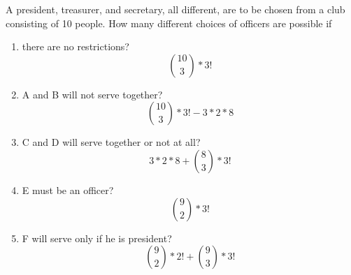 \item A president, treasurer, and secretary, all different, are to be chosen from a club consisting of 10 people. How many different choices of officers are possible if
\begin{enumerate}
    \item there are no restrictions?
    \[ \binom{10}{3} * 3! \]
    \item A and B will not serve together?
    \[ \binom{10}{3} * 3! - 3 * 2 * 8 \]
    \item C and D will serve together or not at all?
    \[ 3 * 2 * 8 + \binom{8}{3} * 3! \]
    \item E must be an officer?
    \[ \binom{9}{2} * 3! \]
    \item F will serve only if he is president?
    \[ \binom{9}{2} * 2! + \binom{9}{3} * 3! \]
\end{enumerate}
